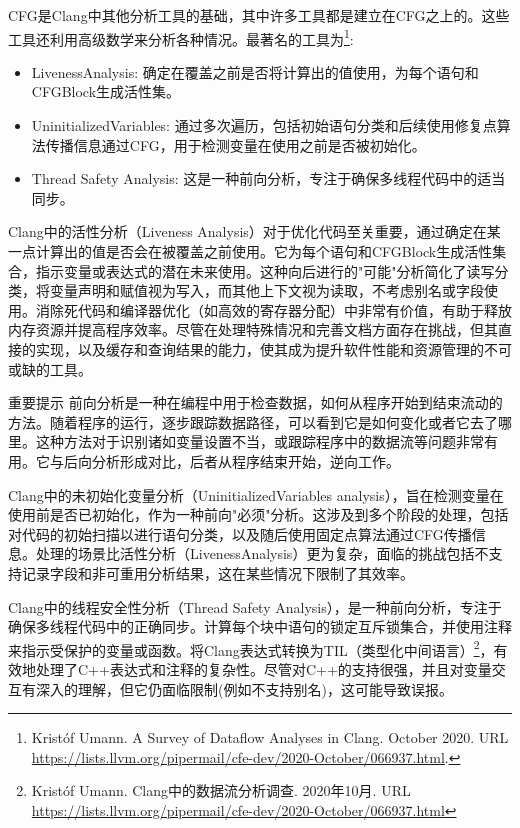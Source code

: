 
CFG是Clang中其他分析工具的基础，其中许多工具都是建立在CFG之上的。这些工具还利用高级数学来分析各种情况。最著名的工具为\footnote{Kristóf Umann. A Survey of Dataflow Analyses in Clang. October 2020. URL \url{https://lists.llvm.org/pipermail/cfe-dev/2020-October/066937.html}.}:

\begin{itemize}
\item
LivenessAnalysis: 确定在覆盖之前是否将计算出的值使用，为每个语句和CFGBlock生成活性集。

\item
UninitializedVariables: 通过多次遍历，包括初始语句分类和后续使用修复点算法传播信息通过CFG，用于检测变量在使用之前是否被初始化。

\item
Thread Safety Analysis: 这是一种前向分析，专注于确保多线程代码中的适当同步。
\end{itemize}

Clang中的活性分析（Liveness Analysis）对于优化代码至关重要，通过确定在某一点计算出的值是否会在被覆盖之前使用。它为每个语句和CFGBlock生成活性集合，指示变量或表达式的潜在未来使用。这种向后进行的"可能"分析简化了读写分类，将变量声明和赋值视为写入，而其他上下文视为读取，不考虑别名或字段使用。消除死代码和编译器优化（如高效的寄存器分配）中非常有价值，有助于释放内存资源并提高程序效率。尽管在处理特殊情况和完善文档方面存在挑战，但其直接的实现，以及缓存和查询结果的能力，使其成为提升软件性能和资源管理的不可或缺的工具。

\begin{myNotic}{重要提示}
前向分析是一种在编程中用于检查数据，如何从程序开始到结束流动的方法。随着程序的运行，逐步跟踪数据路径，可以看到它是如何变化或者它去了哪里。这种方法对于识别诸如变量设置不当，或跟踪程序中的数据流等问题非常有用。它与后向分析形成对比，后者从程序结束开始，逆向工作。
\end{myNotic}

Clang中的未初始化变量分析（UninitializedVariables analysis），旨在检测变量在使用前是否已初始化，作为一种前向"必须"分析。这涉及到多个阶段的处理，包括对代码的初始扫描以进行语句分类，以及随后使用固定点算法通过CFG传播信息。处理的场景比活性分析（LivenessAnalysis）更为复杂，面临的挑战包括不支持记录字段和非可重用分析结果，这在某些情况下限制了其效率。

Clang中的线程安全性分析（Thread Safety Analysis），是一种前向分析，专注于确保多线程代码中的正确同步。计算每个块中语句的锁定互斥锁集合，并使用注释来指示受保护的变量或函数。将Clang表达式转换为TIL（类型化中间语言）\footnote{Kristóf Umann. Clang中的数据流分析调查. 2020年10月. URL \url{https://lists.llvm.org/pipermail/cfe-dev/2020-October/066937.html}}，有效地处理了C++表达式和注释的复杂性。尽管对C++的支持很强，并且对变量交互有深入的理解，但它仍面临限制(例如不支持别名)，这可能导致误报。










